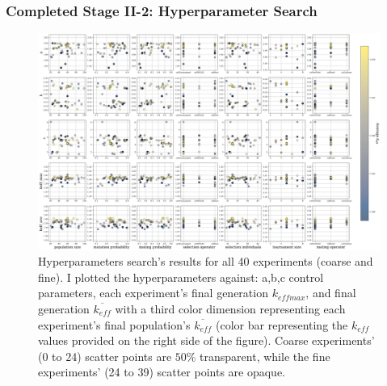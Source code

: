 \begin{frame}
    \frametitle{Completed Stage II-2: Hyperparameter Search}
    \begin{figure}[]
        \centering
        \begin{minipage}[c]{0.6\textwidth}
        \centering
        \includegraphics[width=\linewidth]{../docs/figures/input_hyperparameters_sens.png} 
        \end{minipage}\hfill
        \begin{minipage}[c]{0.4\textwidth}
        \caption{Hyperparameters search's results for all 40 experiments (coarse 
        and fine). I plotted the hyperparameters against: a,b,c control parameters, 
        each experiment's final generation $k_{eff max}$, and final generation 
        $\overline{k_{eff}}$ with a third color dimension representing each experiment's final 
        population's $\overline{k_{eff}}$ (color bar representing the $k_{eff}$ values 
        provided on the right side of the figure). Coarse experiments' (0 to 24) scatter points 
        are $50\%$ transparent, while the fine experiments' (24 to 39) scatter points 
        are opaque.}
        \end{minipage}
    \end{figure}
\end{frame}

